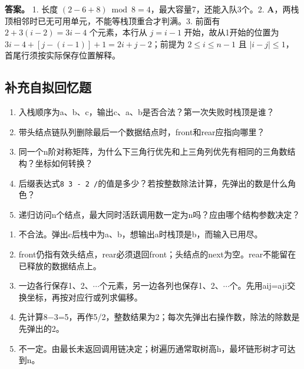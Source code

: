 \textbf{答案。} 1. 长度 \((2-6+8)\bmod8=4\)，最大容量7，还能入队3个。2. \textbf{A}，两栈顶相邻时已无可用单元，不能等栈顶重合才判满。3. 前面有 \(2+3(i-2)=3i-4\) 个元素，本行从 \(j=i-1\) 开始，故从1开始的位置为 \(3i-4+[j-(i-1)]+1=2i+j-2\)；前提为 \(2\le i\le n-1\) 且 \(|i-j|\le1\)，首尾行须按实际保存位置解释。

\subsection{补充自拟回忆题}\label{DS03-recall-extra}

\begin{recallcard}

\begin{enumerate}
\def\labelenumi{\arabic{enumi}.}
\setcounter{enumi}{3}
\tightlist
\item
  入栈顺序为a、b、c，输出c、a、b是否合法？第一次失败时栈顶是谁？
\item
  带头结点链队列删除最后一个数据结点时，front和rear应指向哪里？
\item
  同一个n阶对称矩阵，为什么下三角行优先和上三角列优先有相同的三角数结构？坐标如何转换？
\item
  后缀表达式\texttt{8 3 - 2 /\allowbreak{}}的值是多少？若按整数除法计算，先弹出的数是什么角色？
\item
  递归访问n个结点，最大同时活跃调用数一定为n吗？应由哪个结构参数决定？
\end{enumerate}

\end{recallcard}

\begin{solution}[补充题核对答案]

\begin{enumerate}
\def\labelenumi{\arabic{enumi}.}
\setcounter{enumi}{3}
\tightlist
\item
  不合法。弹出c后栈中为a、b，想输出a时栈顶是b，而输入已用尽。
\item
  front仍指有效头结点，rear必须退回front；头结点的next为空。rear不能留在已释放的数据结点上。
\item
  一边各行保存1、2、\ensuremath{\cdots}个元素，另一边各列也保存1、2、\ensuremath{\cdots}个。先用aij=aji交换坐标，再按对应行或列求偏移。
\item
  先计算8\ensuremath{-}3=5，再作5/2，整数结果为2；每次先弹出右操作数，除法的除数是先弹出的2。
\item
  不一定。由最长未返回调用链决定；树遍历通常取树高h，最坏链形树才可达到n。
\end{enumerate}

\end{solution}
